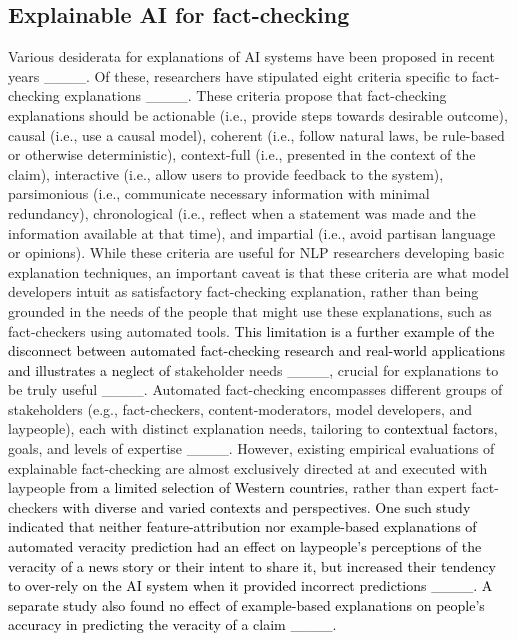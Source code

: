 

\subsection{Explainable AI for fact-checking} \label{relwork:explainableAI}

Various desiderata for explanations of AI systems have been proposed in recent years ____. Of these, researchers have stipulated eight criteria specific to fact-checking explanations ____. 
These criteria propose that fact-checking explanations should be actionable (i.e., provide steps towards desirable outcome), causal (i.e., use a causal model), coherent (i.e., follow natural laws, be rule-based or otherwise deterministic), context-full (i.e., presented in the context of the claim), interactive (i.e., allow users to provide feedback to the system), parsimonious (i.e., communicate necessary information with minimal redundancy), chronological (i.e., reflect when a statement was made and the information available at that time), and impartial (i.e., avoid partisan language or opinions).
While these criteria are useful for NLP researchers developing basic explanation techniques, an important caveat is that these criteria are what model developers intuit as satisfactory fact-checking explanation, rather than being grounded in the needs of the people that might use these explanations, such as fact-checkers using automated tools.
\textcolor{black}{This limitation is a further example of the disconnect between automated fact-checking research and real-world applications and illustrates a neglect of} stakeholder needs ____, crucial for explanations to be truly useful ____.
Automated fact-checking encompasses different groups of stakeholders (e.g., fact-checkers, content-moderators, model developers, and laypeople), each with distinct explanation needs, tailoring to \textcolor{black}{contextual factors}, goals, and levels of expertise ____.
However, existing empirical evaluations of explainable fact-checking are almost exclusively directed at and executed with laypeople \textcolor{black}{from a limited selection of Western countries}, rather than expert fact-checkers \textcolor{black}{with diverse and varied contexts and perspectives}.
\textcolor{black}{One such study indicated that neither feature-attribution nor example-based explanations of automated veracity prediction had an effect on laypeople's perceptions of the veracity of a news story or their intent to share it, but increased their tendency to over-rely on the AI system when it provided incorrect predictions ____. A separate study also found no effect of example-based explanations on people's accuracy in predicting the veracity of a claim ____.}
